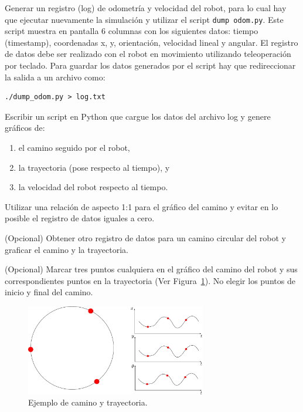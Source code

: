 \documentclass[tp]{lcc}
\begin{document}
\ejercicio Generar un registro (log) de odometría y velocidad del robot, para lo cual hay que ejecutar nuevamente la simulación y utilizar el script \lstinline[style=bash]{dump odom.py}. Este script muestra en pantalla 6 columnas con los siguientes datos: tiempo (timestamp), coordenadas x, y, orientación, velocidad lineal y angular. El registro de datos debe ser realizado con el robot en movimiento utilizando teleoperación por teclado. Para guardar los datos generados por el script hay que redireccionar la salida a un archivo como:

\begin{lstlisting}[style=bash] 
./dump_odom.py > log.txt
\end{lstlisting}

\ejercicio Escribir un script en Python que cargue los datos del archivo log y genere gráficos de:
\begin{enumerate}
	\item el camino seguido por el robot,
	\item la trayectoria (pose respecto al tiempo), y
	\item la velocidad del robot respecto al tiempo.
\end{enumerate} 

\begin{nota}
	Utilizar una relación de aspecto 1:1 para el gráfico del camino y evitar en lo posible el registro de datos iguales a cero.
\end{nota}

\ejercicio (Opcional) Obtener otro registro de datos para un camino circular del robot y graficar el camino y la trayectoria.

\ejercicio (Opcional) Marcar tres puntos cualquiera en el gráfico del camino del robot y sus correspondientes puntos en la trayectoria (Ver Figura~\ref{fig:trajectory_example}). No elegir los puntos de inicio y final del camino.

\begin{figure}[!htbp]
    \centering
    \includegraphics[width=0.7\textwidth]{./images/trajectory_example.pdf}
    \caption{Ejemplo de camino y trayectoria.}
    \label{fig:trajectory_example}
\end{figure}
\end{document}
